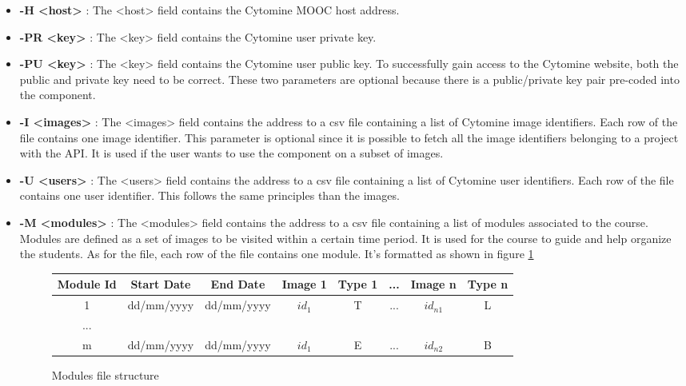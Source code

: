 \documentclass[a4paper,11pt]{report}
\numberwithin{figure}{chapter} %
\begin{document}
        \begin{itemize}
            \item[\textbullet] \textbf{-H <host>} : The <host> field contains the Cytomine MOOC host address.
            \item[\textbullet] \textbf{-PR <key>} : The <key> field contains the Cytomine user private key.
            \item[\textbullet] \textbf{-PU <key>} : The <key> field contains the Cytomine user public key.
            To successfully gain access to the Cytomine website, both the public and private key need to be correct.
            These two parameters are optional because there is a public/private key pair pre-coded into the component.
            \item[\textbullet] \textbf{-I <images>} : The <images> field contains the address to a csv file containing a list of Cytomine image identifiers.
            Each row of the file contains one image identifier.
            This parameter is optional since it is possible to fetch all the image identifiers belonging to a project with the API.
            It is used if the user wants to use the component on a subset of images.
            \item[\textbullet] \textbf{-U <users>} : The <users> field contains the address to a csv file containing a list of Cytomine user identifiers.
            Each row of the file contains one user identifier.
            This follows the same principles than the images.
            \item[\textbullet] \textbf{-M <modules>} : The <modules> field contains the address to a csv file containing a list of modules associated to the course.
            Modules are defined as a set of images to be visited within a certain time period.
            It is used for the course to guide and help organize the students.
            As for the file, each row of the file contains one module.
            It's formatted as shown in figure \ref{fig:moddd}
            \begin{figure}[H]
              \centering
              \begin{tabular}{| c | c | c | c | c | c | c | c |}
              \hline
              \tiny{Module Id} & \tiny{Start Date} & \tiny{End Date} & \tiny{Image 1} & \tiny{Type 1} & \tiny{...} & \tiny{Image n} & \tiny{Type n}\\ \hline
              \tiny{1} & \tiny{dd/mm/yyyy} & \tiny{dd/mm/yyyy} & \tiny{$id_1$} & \tiny{T} & \tiny{...} & \tiny{$id_{n1}$} & \tiny{L}\\ \hline
              \tiny{...} & & & & & & & \\ \hline
              \tiny{m} & \tiny{dd/mm/yyyy} & \tiny{dd/mm/yyyy} & \tiny{$id_1$} & \tiny{E} & \tiny{...} & \tiny{$id_{n2}$} & \tiny{B}\\ \hline
              \end{tabular}
              \caption{Modules file structure}
              \label{fig:moddd}
            \end{figure}



\end{itemize}
\end{document}
